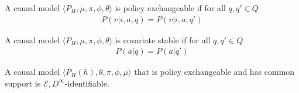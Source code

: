 \begin{definition}\label{def:policy_exchangeability}
A causal model $\langle P_H, \mu,\pi,\phi,\theta\rangle$ is policy exchangeable if for all $q,q'\in Q$
\begin{align}
    P(v|i,a,q) = P(v|i,a,q')
\end{align}
\end{definition}

\begin{definition}\label{def:covariate_stability}
A causal model $\langle P_H, \mu,\pi,\phi,\theta\rangle$ is covariate stable if for all $q,q'\in Q$
\begin{align}
  P(a|q) = P(a|q')
\end{align}
\end{definition}


\begin{theorem}\label{th:pex_unc_ident}
A causal model $\langle P_H(h),\theta,\pi,\phi,\mu \rangle$ that is policy exchangeable and has common support is $\underline{\mathscr{E}}, D^\infty$-identifiable.
\end{theorem}

